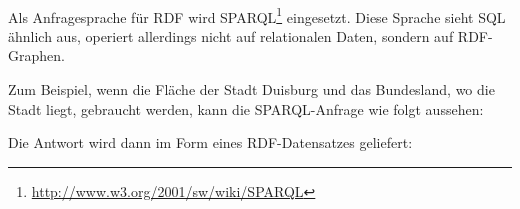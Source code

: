 \paragraph{}
Als Anfragesprache für RDF wird SPARQL\footnote{\url{http://www.w3.org/2001/sw/wiki/SPARQL}} eingesetzt. Diese Sprache sieht SQL ähnlich aus, operiert allerdings nicht auf relationalen Daten, sondern auf RDF-Graphen. 

Zum Beispiel, wenn die Fläche der Stadt Duisburg und das Bundesland, wo die Stadt liegt, gebraucht werden, kann die SPARQL-Anfrage wie folgt aussehen:
\lstset{language=SPARQL}


Die Antwort wird dann im Form eines RDF-Datensatzes geliefert:
\lstset{language=XML}
